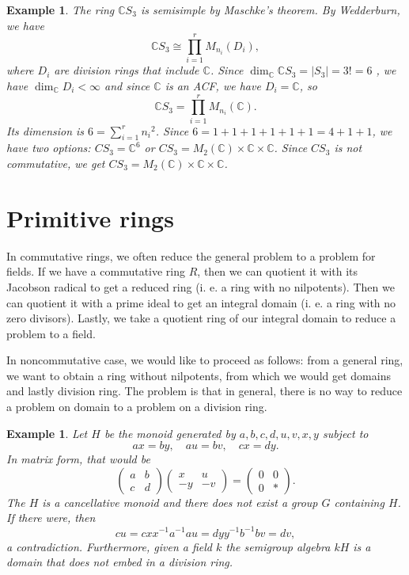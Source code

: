 \documentclass[10pt, a4paper]{article}
\newtheorem{example}[thm]{Example}
\newcommand{\C}{\mathbb {C}}
\begin{document}
\begin{example}
  The ring $\C S_3$ is semisimple by Maschke's theorem. By Wedderburn, we have 
  $$\C S_3 \cong \prod_{i = 1} ^r M_{n_i} (D_i),$$
  where $D_i$ are division rings that include $\C$.
  Since $\dim_{\C} \C S_3 = |S_3| = 3! = 6$ , we have $\dim_{\C} D_i < \infty$
  and since $\C$ is an ACF, we have $D_i = \C$, so 
  $$\C S_3 = \prod_{i = 1} ^r M_{n_i} (\C).$$
  Its dimension is $6 = \sum_{i = 1} ^r {n_i}^2$.
  Since $6 = 1 + 1 + 1 + 1 + 1 + 1 = 4 + 1 + 1$, we have two options:
  $CS_3 = \C^6$ or $CS_3 = M_2 (\C) \times \C \times \C$.
  Since $CS_3$ is not commutative, we get $CS_3 = M_2 (\C) \times \C \times \C$.
\end{example}

\section{Primitive rings}

In commutative rings, we often reduce the general problem to a problem for fields.
If we have a commutative ring $R$, then we can quotient it with its 
Jacobson radical to get a reduced ring (i. e. a ring 
with no nilpotents). Then we can quotient it with a prime ideal to 
get an integral domain (i. e. a ring with no zero divisors). Lastly, we take a 
quotient ring of our integral domain to reduce a problem to a field.

In noncommutative case, we would like to proceed as follows: from a general ring, we want to obtain
a ring without nilpotents, from which we would get domains and lastly division ring.
The problem is that in general, there is no way to reduce a problem on domain to a problem on a division ring.

\begin{example}
  Let $H$ be the monoid generated by $a, b, c, d, u, v, x, y$ subject to 
  $$ax = by,\quad au = bv,\quad cx = dy.$$
  In matrix form, that would be 
  $$\begin{pmatrix}
    a & b\\
    c & d
  \end{pmatrix} \begin{pmatrix}
    x & u\\
    -y & -v
  \end{pmatrix} = \begin{pmatrix}
    0 & 0\\
    0 & *
  \end{pmatrix}.$$
  The $H$ is a cancellative monoid and there does not exist a group $G$ containing $H$.
  If there were, then 
  $$cu = cx x^{-1} a^{-1} a u = dy y^{-1} b^{-1} bv = dv,$$
  a contradiction. Furthermore, given a field $k$ the semigroup algebra $kH$
  is a domain that does not embed in a division ring.
\end{example}
\end{document}
